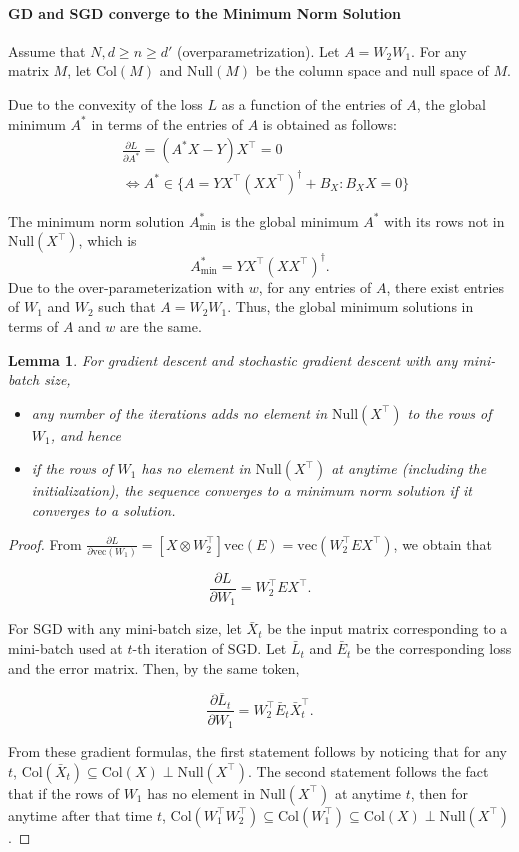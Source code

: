 \documentclass[10pt]{article}
\newtheorem{lemma}{Lemma}
\newcommand{\Col}{\mathrm{Col}}
\newcommand{\Null}{\mathrm{Null}}
\newcommand{\vect}{\mathrm{vec}}
\begin{document}

\paragraph{GD and SGD converge to the Minimum Norm Solution }
Assume that $N,d \ge n \ge d'$ (overparametrization).  Let
$A=W_2W_1$. For any matrix $M$, let $\Col(M)$ and $\Null(M)$ be the
column space and null space of $M$.

Due to the convexity of the loss $L$ as a function of the entries of
$A$, the global minimum $A^*$ in terms of the entries of $A$ is
obtained as follows: \begin{align*} &\frac{\partial L}{\partial A^*} =
  (A^*X-Y) X^\top = 0 \\ & \Leftrightarrow A^* \in \{A= YX
  ^{\top}(XX^{\top})^{\dagger}+ B_X : B_{X}X=0 \}
\end{align*} 


The minimum norm solution $A^*_{\min}$ is the global minimum $A^*$
with its rows not in $\Null(X^\top)$, which is
$$
A^*_{\min} =  YX ^{\top}(XX^{\top})^{\dagger}.
$$ 
Due to the over-parameterization with $w$, for any entries of $A$,
there exist entries of $W_{1}$ and $W_2$ such that $A=W_2W_1$. Thus,
the global minimum solutions in terms of $A$ and $w$ are the same.


\begin{lemma} \label{lemma:1-hidden_minimum_norm}
For gradient descent  and stochastic gradient descent with any mini-batch size, 
\begin{itemize}
\item 
any number of the iterations adds no element in $\Null(X^\top)$ to the rows of $W_1$, and hence
\item if the rows of $W_1$ has no element in $\Null(X^\top)$ at
  anytime (including the initialization), the sequence converges to a
  minimum norm solution if it converges to a solution.
\end{itemize}
\end{lemma}
\begin{proof}
From $\frac{\partial L}{\partial \vect(W_1)} =[X \otimes W_2^{\top}]\vect(E) = \vect(W_2^\top E X^\top)$, we obtain that

$$
\frac{\partial L}{\partial W_1} = W_2^\top E X^\top.
$$

For SGD with any mini-batch size, let $\bar X_t$ be the input matrix
corresponding to a mini-batch used at $t$-th iteration of SGD. Let
$\bar L_t$ and $\bar E_t$ be the corresponding loss and the error
matrix. Then, by the same token,

$$
\frac{\partial \bar L_t}{\partial W_1} = W_2^\top \bar E_t \bar X^\top_t.
$$

From these gradient formulas, the first statement follows by noticing
that for any $t$,
$\Col(\bar X_t ) \subseteq\Col(X)\perp \Null(X^{\top})$. The second
statement follows the fact that if the rows of $W_1$ has no element in
$\Null(X^\top)$ at anytime $t$, then for anytime after that time $t$,
$\Col(W_1^\top W_2^\top) \subseteq\Col(W_1^\top )
\subseteq\Col(X)\perp \Null(X^{\top})$.

\end{proof}
\end{document}
